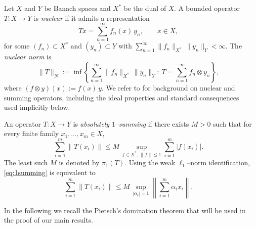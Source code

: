 \documentclass{amsart}
\theoremstyle{definition}\newtheorem{defn}[thm]{Definition}
\theoremstyle{remark}
\numberwithin{equation}{section}
\begin{document}
Let $X$ and $Y$ be Banach spaces and $X^*$ be the dual of $X$.
A bounded operator $T:X\to Y$ is \emph{nuclear} if it admits a representation
\begin{equation}\label{A}
Tx=\sum_{n=1}^{\infty} f_n(x)\,y_n,
\qquad x\in X,
\end{equation}
for some $(f_n)\subset X^*$ and $(y_n)\subset Y$ with
$\sum_{n=1}^{\infty}\|f_n\|_{X^*}\,\|y_n\|_{Y}<\infty$.
The \emph{nuclear norm} is
\[
\|T\|_{N}
:=\inf\left\{\sum_{n=1}^{\infty}\|f_n\|_{X^*}\,\|y_n\|_{Y}:\ T=\sum_{n=1}^{\infty} f_n\otimes y_n\right\},
\]
where $(f\otimes y)(x):=f(x)\,y$. We refer to \cite{Pietsch1972,Diestel1995} for background on nuclear and summing operators,
including the ideal properties and standard consequences used implicitly below.

\medskip
An operator $T:X\to Y$ is \emph{absolutely $1$--summing} if there exists $M>0$ such that for every finite family
$x_1,\dots,x_m\in X$,
\begin{equation}\label{eq:1summing}
\sum_{i=1}^{m}\|T(x_i)\|
\le M\,\sup_{f\in X^*,\,\|f\|\le 1}\sum_{i=1}^{m}|f(x_i)|.
\end{equation}
The least such $M$ is denoted by $\pi_1(T)$. Using the weak $\ell_1$--norm identification, \eqref{eq:1summing} is equivalent to
\[
\sum_{i=1}^{m}\|T(x_i)\|
\le M\,\sup_{|\alpha_i|=1}\left\|\sum_{i=1}^{m}\alpha_i x_i\right\|.
\]

In the following we recall the Pietsch's domination theorem that will be used in the proof of our main results.
\end{document}
